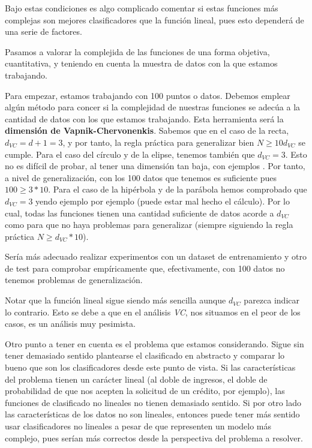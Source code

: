 \documentclass[11pt]{article}
\begin{document}
Bajo estas condiciones es algo complicado comentar si estas funciones más complejas son mejores clasificadores que la función lineal, pues esto dependerá de una serie de factores.

Pasamos a valorar la complejida de las funciones de una forma objetiva, cuantitativa, y teniendo en cuenta la muestra de datos con la que estamos trabajando.

Para empezar, estamos trabajando con 100 puntos o datos. Debemos emplear algún método para concer si la complejidad de nuestras funciones se adecúa a la cantidad de datos con los que estamos trabajando. Esta herramienta será la \textbf{dimensión de Vapnik-Chervonenkis}. Sabemos que en el caso de la recta, $d_{VC} = d + 1 = 3$, y por tanto, la regla práctica para generalizar bien $N \geq 10 d_{VC}$ se cumple. Para el caso del círculo y de la elipse, tenemos también que $d_{VC} = 3$. Esto no es difícil de probar, al tener una dimensión tan baja, con ejemplos \footnotemark. Por tanto, a nivel de generalización, con los 100 datos que tenemos es suficiente pues $100 \geq 3 * 10$. Para el caso de la hipérbola y de la parábola hemos comprobado que $d_{VC} = 3$ yendo ejemplo por ejemplo (puede estar mal hecho el cálculo). Por lo cual, todas las funciones tienen una cantidad suficiente de datos acorde a $d_{VC}$ como para que no haya problemas para generalizar (siempre siguiendo la regla práctica $N \geq d_{VC} * 10$).

Sería más adecuado realizar experimentos con un dataset de entrenamiento y otro de test para comprobar empíricamente que, efectivamente, con 100 datos no tenemos problemas de generalización.

Notar que la función lineal sigue siendo más sencilla aunque $d_{VC}$ parezca indicar lo contrario. Esto se debe a que en el análisis \emph{VC}, nos situamos en el peor de los casos, es un análisis muy pesimista.

Otro punto a tener en cuenta es el problema que estamos considerando. Sigue sin tener demasiado sentido plantearse el clasificado en abstracto y comparar lo bueno que son los clasificadores desde este punto de vista. Si las características del problema tienen un carácter lineal (al doble de ingresos, el doble de probabilidad de que nos acepten la solicitud de un crédito, por ejemplo), las funciones de clasificado no lineales no tienen demasiado sentido. Si por otro lado las características de los datos no son lineales, entonces puede tener más sentido usar clasificadores no lineales a pesar de que representen un modelo más complejo, pues serían más correctos desde la perspectiva del problema a resolver.
\end{document}
